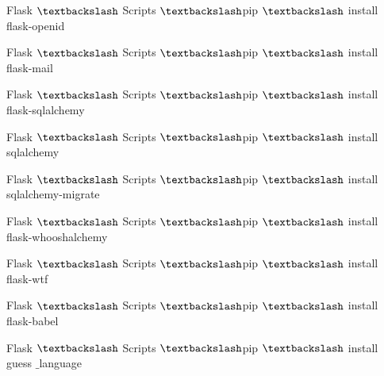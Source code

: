 \vspace{14pt}
\noindent 
{\fontsize{14pt}{14pt}\selectfont Flask $  \textbackslash  $ Scripts  $  \textbackslash  $pip $  \textbackslash  $ install flask-openid \\} \par
\vspace{14pt}
\noindent 
{\fontsize{14pt}{14pt}\selectfont Flask $  \textbackslash  $ Scripts  $  \textbackslash  $pip $  \textbackslash  $ install flask-mail \\} \par
\vspace{14pt}
\noindent 
{\fontsize{14pt}{14pt}\selectfont Flask $  \textbackslash  $ Scripts  $  \textbackslash  $pip $  \textbackslash  $ install flask-sqlalchemy \\} \par
\vspace{14pt}
\noindent 
{\fontsize{14pt}{14pt}\selectfont Flask $  \textbackslash  $ Scripts  $  \textbackslash  $pip $  \textbackslash  $ install sqlalchemy \\} \par
\vspace{14pt}
\noindent 
{\fontsize{14pt}{14pt}\selectfont Flask $  \textbackslash  $ Scripts  $  \textbackslash  $pip $  \textbackslash  $ install sqlalchemy-migrate \\} \par
\vspace{14pt}
\noindent 
{\fontsize{14pt}{14pt}\selectfont Flask $  \textbackslash  $ Scripts  $  \textbackslash  $pip $  \textbackslash  $ install flask-whooshalchemy \\} \par
\vspace{14pt}
\noindent 
{\fontsize{14pt}{14pt}\selectfont Flask $  \textbackslash  $ Scripts  $  \textbackslash  $pip $  \textbackslash  $ install flask-wtf \\} \par
\vspace{14pt}
\noindent 
{\fontsize{14pt}{14pt}\selectfont Flask $  \textbackslash  $ Scripts  $  \textbackslash  $pip $  \textbackslash  $ install flask-babel \\} \par
\vspace{14pt}
\noindent 
{\fontsize{14pt}{14pt}\selectfont Flask $  \textbackslash  $ Scripts  $  \textbackslash  $pip $  \textbackslash  $ install guess $  \_  $language \\} \par
